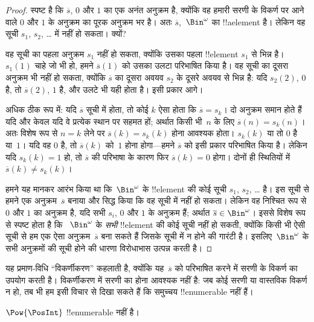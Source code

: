 \documentclass[../../../include/open-logic-section]{subfiles}
\begin{document}
\begin{proof}
स्पष्ट है कि $\overline{s}$, $0$ और $1$ का एक अनंत अनुक्रम है, क्योंकि वह
हमारी सरणी के विकर्ण पर आने वाले $0$ और $1$ के अनुक्रम का पूरक अनुक्रम भर
है। अतः $\overline{s}$,~$\Bin^\omega$ का !!a{element} है। लेकिन वह सूची
$s_1$, $s_2$, \dots{} में नहीं हो सकता। क्यों?

वह सूची का पहला अनुक्रम $s_1$ नहीं हो सकता, क्योंकि उसका पहला !!{element}
$s_1$ से भिन्न है। $s_1(1)$ चाहे जो भी हो, हमने $\overline{s}(1)$ को उसका
उलटा परिभाषित किया है। वह सूची का दूसरा अनुक्रम भी नहीं हो सकता, क्योंकि
$\overline{s}$ का दूसरा अवयव $s_2$ के दूसरे अवयव से भिन्न है: यदि $s_2(2)$,
$0$ है, तो $\overline{s}(2)$, $1$ है, और उलटे भी यही होता है। इसी प्रकार आगे।

अधिक ठीक रूप में: यदि $\overline{s}$ सूची में होता, तो कोई $k$ ऐसा होता कि
$\overline{s} = s_{k}$। दो अनुक्रम समान होते हैं यदि और केवल यदि वे प्रत्येक
स्थान पर सहमत हों; अर्थात किसी भी~$n$ के लिए $\overline{s}(n) =
s_{k}(n)$। अतः विशेष रूप से $n = k$ लेने पर $\overline{s}(k) = s_{k}(k)$
होना आवश्यक होता। $s_k(k)$ या तो $0$ है या~$1$। यदि वह $0$ है, तो
$\overline{s}(k)$ को~$1$ होना होगा---हमने $\overline{s}$ को इसी प्रकार
परिभाषित किया है। लेकिन यदि $s_k(k) = 1$ हो, तो $\overline{s}$ की परिभाषा
के कारण फिर $\overline{s}(k) = 0$ होगा। दोनों ही स्थितियों में
$\overline{s}(k) \neq s_{k}(k)$।

हमने यह मानकर आरंभ किया था कि~$\Bin^\omega$ के !!{element} की कोई सूची
$s_1$, $s_2$, \dots{} है। इस सूची से हमने एक अनुक्रम~$\overline{s}$ बनाया
और सिद्ध किया कि वह सूची में नहीं हो सकता। लेकिन वह निश्चित रूप से $0$ और
$1$ का अनुक्रम है, यदि सभी $s_i$, $0$ और $1$ के अनुक्रम हैं; अर्थात
$\overline{s} \in
\Bin^\omega$। इससे विशेष रूप से स्पष्ट होता है कि
~$\Bin^\omega$ के \emph{सभी} !!{element} की कोई सूची नहीं हो सकती, क्योंकि
किसी भी ऐसी सूची से हम एक ऐसा अनुक्रम~$\overline{s}$ बना सकते हैं जिसके सूची
में न होने की गारंटी है। इसलिए~$\Bin^\omega$ के सभी अनुक्रमों की सूची होने
की धारणा विरोधाभास उत्पन्न करती है।
\end{proof}

\begin{explain}
यह प्रमाण-विधि ``विकर्णीकरण'' कहलाती है, क्योंकि यह~$\overline{s}$ को
परिभाषित करने में सरणी के विकर्ण का उपयोग करती है। विकर्णीकरण में सरणी का
होना आवश्यक नहीं है: जब कोई सरणी या वास्तविक विकर्ण न हो, तब भी हम इसी
विचार से दिखा सकते हैं कि समुच्चय !!{enumerable} नहीं हैं।
\end{explain}

\begin{thm}
$\Pow{\PosInt}$ !!{enumerable} नहीं है।
\end{thm}
\end{document}
